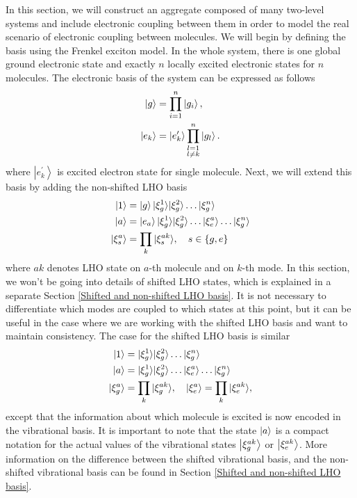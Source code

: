 In this section, we will construct an aggregate composed of many two-level systems and include electronic coupling between them in order to model the real scenario of electronic coupling between molecules. We will begin by defining the basis using the Frenkel exciton model. In the whole system, there is one global ground electronic state and exactly $n$ locally excited electronic states for $n$ molecules. The electronic basis of the system can be expressed as follows
\begin{equation}    
\begin{aligned}
\label{aggregate:electron_basis}
    \ket{g} &=\prod_{i=1}^n\ket{g_i}, \\
    \ket{e_k} &= \left|e^\prime_{k}\right\rangle \prod_{\substack{l=1 \\ l\neq k}}^n\left|g_{l}\right\rangle.
\end{aligned}
\end{equation}
where $\left|e^\prime_{k}\right\rangle$ is excited electron state for single molecule. Next, we will extend this basis by adding the non-shifted LHO basis
\begin{equation}
\label{aggregate:aggregate_basis}
\begin{aligned}
    \ket{1} &= \ket{g} |\xi^1_g\rangle |\xi^2_g\rangle \ldots |\xi^n_g\rangle \\ 
    \ket{a} &= \ket{e_a} |\xi^1_g\rangle |\xi^2_g\rangle \ldots |\xi^a_e\rangle  \ldots |\xi^n_g\rangle \\
    |\xi^a_s\rangle &= \prod_{k} |\xi^{ak}_s\rangle, \quad s\in \{g, e\}\\
\end{aligned}
\end{equation}
where $ak$ denotes LHO state on $a$-th molecule and on $k$-th mode. In this section, we won't be going into details of shifted LHO states, which is explained in a separate Section \ref{Shifted and non-shifted LHO basis}. It is not necessary to differentiate which modes are coupled to which states at this point, but it can be useful in the case where we are working with the shifted LHO basis and want to maintain consistency. The case for the shifted LHO basis is similar
\begin{equation}
\begin{aligned}
    \ket{1} &= |\xi^1_g\rangle |\xi^2_g\rangle \ldots |\xi^n_g\rangle \\ 
    \ket{a} &= |\xi^1_g\rangle |\xi^2_g\rangle \ldots |\xi^a_e\rangle  \ldots |\xi^n_g\rangle \\
    |\xi^a_g\rangle &= \prod_{k} |\xi^{ak}_g\rangle, \quad |\xi^a_e\rangle = \prod_{k} |\xi^{ak}_e\rangle,\\
\end{aligned}
\end{equation}
except that the information about which molecule is excited is now encoded in the vibrational basis. It is important to note that the state $\ket{a}$ is a compact notation for the actual values of the vibrational states $\ket{\xi^{ak}_g}$ or $\ket{\xi^{ak}_e}$. More information on the difference between the shifted vibrational basis, and the non-shifted vibrational basis can be found in Section \ref{Shifted and non-shifted LHO basis}.

